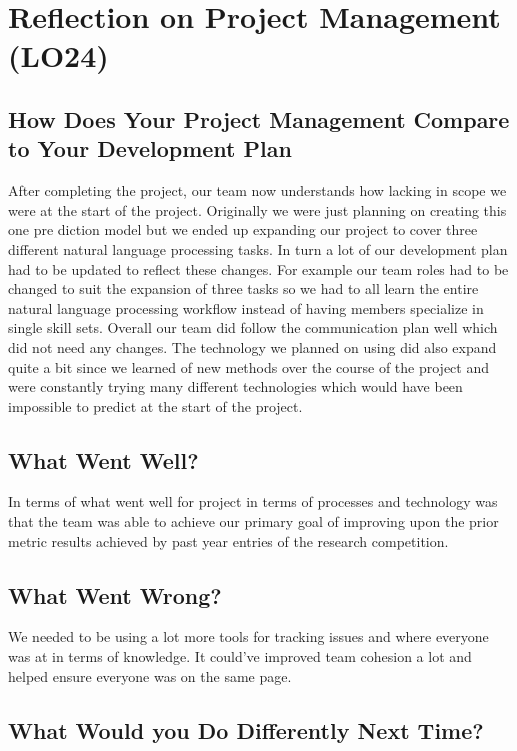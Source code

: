 \documentclass{article}
\begin{document}
\section{Reflection on Project Management (LO24)}

\subsection{How Does Your Project Management Compare to Your Development Plan}

After completing the project, our team now understands how lacking in scope we were at the start of the project. Originally we were just planning on creating this one pre  diction model but we ended up expanding our project to cover three different natural language processing tasks. In turn a lot of our development plan had to be updated to reflect these changes. For example our team roles had to be changed to suit the expansion of three tasks so we had to all learn the entire natural language processing workflow instead of having members specialize in single skill sets. Overall our team did follow the communication plan well which did not need any changes. The technology we planned on using did also expand quite a bit since we learned of new methods over the course of the project and were constantly trying many different technologies which would have been impossible to predict at the start of the project.

\subsection{What Went Well?}

In terms of what went well for project in terms of processes and technology was that the team was able to achieve our primary goal of improving upon the prior metric results achieved by past year entries of the research competition.  

\subsection{What Went Wrong?}

We needed to be using a lot more tools for tracking issues and where everyone was at in terms of knowledge. It could've improved team cohesion a lot and helped ensure everyone was on the same page.

\subsection{What Would you Do Differently Next Time?}
\end{document}
